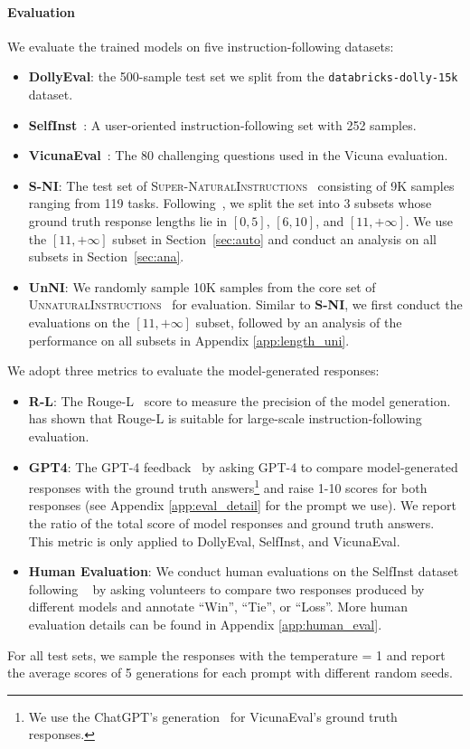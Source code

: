 \documentclass{article}
\begin{document}
\paragraph{Evaluation} We evaluate the trained models on five instruction-following datasets: 
\begin{itemize}[leftmargin=12pt,noitemsep,topsep=-3pt]
    \item \textbf{DollyEval}: the 500-sample test set we split from the \texttt{databricks-dolly-15k} dataset. 
    \item \textbf{SelfInst}~\citep{self_inst}: A user-oriented instruction-following set with 252 samples.
    \item \textbf{VicunaEval}~\citep{vicuna}: The 80 challenging questions used in the Vicuna evaluation. 
    \item \textbf{S-NI}: The test set of \textsc{Super-NaturalInstructions}~\citep{super-natural-instructions} consisting of 9K samples ranging from 119 tasks. Following~\cite{ITGPT4}, we split the set into 3 subsets whose ground truth response lengths lie in $[0,5]$, $[6,10]$, and $[11,+\infty]$. We use the $[11, +\infty]$ subset in Section~\ref{sec:auto} and conduct an analysis on all subsets in Section~\ref{sec:ana}.
    \item \textbf{UnNI}: We randomly sample 10K samples from the core set of \textsc{UnnaturalInstructions}~\citep{uinst} for evaluation. Similar to \textbf{S-NI}, we first conduct the evaluations on the $[11, +\infty]$ subset, followed by an analysis of the performance on all subsets in Appendix \ref{app:length_uni}.
\end{itemize}
We adopt three metrics to evaluate the model-generated responses: 
\begin{itemize}[leftmargin=12pt,topsep=-1pt]
    \item \textbf{R-L}: The Rouge-L~\citep{rouge} score to measure the precision of the model generation. \cite{super-natural-instructions} has shown that Rouge-L is suitable for large-scale instruction-following evaluation.
    \item \textbf{GPT4}: The GPT-4 feedback~\citep{mtbench} by asking GPT-4 to compare model-generated responses with the ground truth answers\footnote{We use the ChatGPT's generation~\citep{chatgpt} for VicunaEval's ground truth responses.} and raise 1-10 scores for both responses (see Appendix \ref{app:eval_detail} for the prompt we use). We report the ratio of the total score of model responses and ground truth answers. This metric is only applied to DollyEval, SelfInst, and VicunaEval.
    \item \textbf{Human Evaluation}: We conduct human evaluations on the SelfInst dataset following ~\cite{ITGPT4} by asking volunteers to compare two responses produced by different models and annotate ``Win'', ``Tie'', or ``Loss''. More human evaluation details can be found in Appendix \ref{app:human_eval}.
\end{itemize}
For all test sets, we sample the responses with the temperature = 1 and report the average scores of 5 generations for each prompt with different random seeds.
\end{document}
